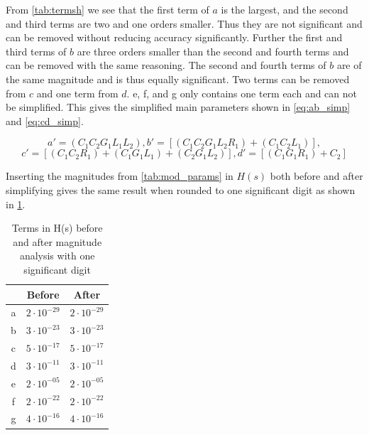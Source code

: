 From \cref{tab:termsh} we see that the first term of $a$ is the largest, and the second and third terms are two and one orders smaller. Thus they are not significant and can be removed without reducing accuracy significantly. Further the first and third terms of $b$ are three orders smaller than the second and fourth terms and can be removed with the same reasoning. The second and fourth terms of $b$ are of the same magnitude and is thus equally significant. Two terms can be removed from $c$ and one term from $d$. e, f, and g only contains one term each and can not be simplified. This gives the simplified main parameters shown in \cref{eq:ab_simp} and \cref{eq:cd_simp}.

\begin{equation} \label{eq:ab_simp}
    a' = (C_1 C_2 G_1 L_1 L_2), b' = [(C_1 C_2 G_1 L_2 R_1)+(C_1 C_2 L_1)],
\end{equation}
\begin{equation} \label{eq:cd_simp}
    c' = [(C_1 C_2 R_1)+(C_1 G_1 L_1)+(C_2 G_1 L_2)], d' = [(C_1 G_1 R_1) + C_2]
\end{equation}

Inserting the magnitudes from \cref{tab:mod_params} in $H(s)$ both before and after simplifying gives the same result when rounded to one significant digit as shown in \cref{tab:beforeafter}.

\begin{table}[h!]
    \centering
    \begin{tabular}{c|c|c}
          & Before             & After \\ \hline
        a & $2 \cdot 10^{-29}$ & $2 \cdot 10^{-29}$ \\
        b & $3 \cdot 10^{-23}$ & $3 \cdot 10^{-23}$ \\
        c & $5 \cdot 10^{-17}$ & $5 \cdot 10^{-17}$ \\
        d & $3 \cdot 10^{-11}$ & $3 \cdot 10^{-11}$ \\
        e & $2 \cdot 10^{-05}$ & $2 \cdot 10^{-05}$ \\
        f & $2 \cdot 10^{-22}$ & $2 \cdot 10^{-22}$ \\
        g & $4 \cdot 10^{-16}$ & $4 \cdot 10^{-16}$ \\
    \end{tabular}
    \caption{Terms in H(s) before and after magnitude analysis with one significant digit}
    \label{tab:beforeafter}
\end{table}


